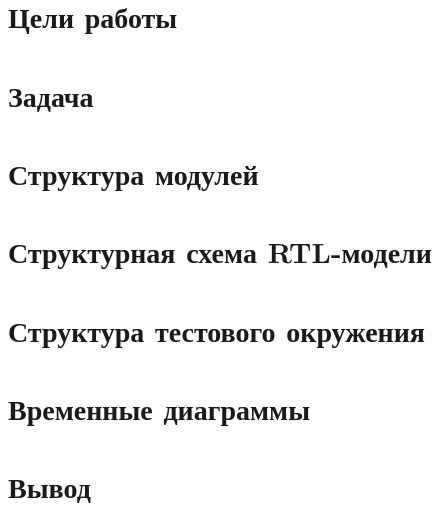 

\usepackage{graphicx}
\fancyhead[LR]{}

\def \labnum {3}
\def \labsubj {Схемотехника ЭВМ}
\def \labauthor {Айтуганов Д. А. \\ Чебыкин И. Б.}
\def \labgroup {P3301}
\def \labinsp {Баевских А. Н.}
\def \labname {Вариант: 2}

\isnametrue
\lstset{
	caption=\lstname,
	basicstyle=\ttfamily\selectfont\scriptsize
}



\tableofcontents
\newpage
\section{Цели работы}

\section{Задача}
\section{Структура модулей}
\section{Структурная схема RTL-модели}
\section{Структура тестового окружения}
\section{Временные диаграммы}
\section{Вывод}

